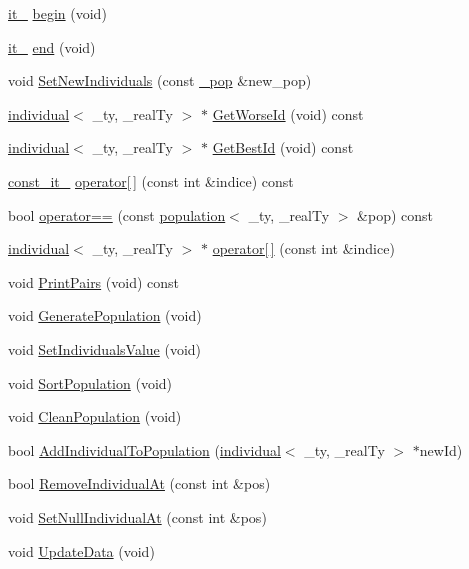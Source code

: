 \begin{DoxyCompactItemize}
\item 
\hyperlink{classpopulation_aa2f35e7dcc0553a7d2a96e5dca6105e0}{it\_\-} \hyperlink{classpopulation_a7c7bcf224b99227f6ab381dbc9f37c2c}{begin} (void)
\item 
\hyperlink{classpopulation_aa2f35e7dcc0553a7d2a96e5dca6105e0}{it\_\-} \hyperlink{classpopulation_a42a620c96d521b7dcbd091c086258a4c}{end} (void)
\item 
void \hyperlink{classpopulation_ac7b74f6cbb098394df06e1c84de0f260}{SetNewIndividuals} (const \hyperlink{classpopulation_a487317a079f4b94c650983ccbd0048a5}{\_\-pop} \&new\_\-pop)
\item 
\hyperlink{classindividual}{individual}$<$ \_\-ty, \_\-realTy $>$ $\ast$ \hyperlink{classpopulation_a251eb4e8235f4c456e2940fe4a0e4678}{GetWorseId} (void) const 
\item 
\hyperlink{classindividual}{individual}$<$ \_\-ty, \_\-realTy $>$ $\ast$ \hyperlink{classpopulation_a9b2b5de6f220010a0d6c780b7ce04e5b}{GetBestId} (void) const 
\item 
\hyperlink{classpopulation_afcea3753ae2b2e0211f8fdc919c51a71}{const\_\-it\_\-} \hyperlink{classpopulation_a6ca81f5193818b065f792fac9b51f6e3}{operator\mbox{[}$\,$\mbox{]}} (const int \&indice) const 
\item 
bool \hyperlink{classpopulation_a1a847bb47928abf5a0d0a7e4a2ec8c5f}{operator==} (const \hyperlink{classpopulation}{population}$<$ \_\-ty, \_\-realTy $>$ \&pop) const 
\item 
\hyperlink{classindividual}{individual}$<$ \_\-ty, \_\-realTy $>$ $\ast$ \hyperlink{classpopulation_a14c45c3fe1905bcb673919ae251087a9}{operator\mbox{[}$\,$\mbox{]}} (const int \&indice)
\item 
void \hyperlink{classpopulation_aba14d0fb6ceb7499c4fc4838889ba918}{PrintPairs} (void) const 
\item 
void \hyperlink{classpopulation_a20b40816fade14ec740cdc3f22d8066e}{GeneratePopulation} (void)
\item 
void \hyperlink{classpopulation_a10331bd5a9f8f4879cea62ee8b1f28c3}{SetIndividualsValue} (void)
\item 
void \hyperlink{classpopulation_a83be39057000008244d4d7bc947d09fa}{SortPopulation} (void)
\item 
void \hyperlink{classpopulation_a6953ec7e3cd8aa654a1621c515e0d166}{CleanPopulation} (void)
\item 
bool \hyperlink{classpopulation_a23a6d7fca0c7cbaffdcf6cb6cf3239a9}{AddIndividualToPopulation} (\hyperlink{classindividual}{individual}$<$ \_\-ty, \_\-realTy $>$ $\ast$newId)
\item 
bool \hyperlink{classpopulation_a1c227882a579ffe0b2fb049518e1eb85}{RemoveIndividualAt} (const int \&pos)
\item 
void \hyperlink{classpopulation_aa2cbedb9d90d9c660b4a4369857e1c96}{SetNullIndividualAt} (const int \&pos)
\item 
void \hyperlink{classpopulation_a7dd1a669bdbc71381ad2d01ca35c24ae}{UpdateData} (void)
\end{DoxyCompactItemize}

